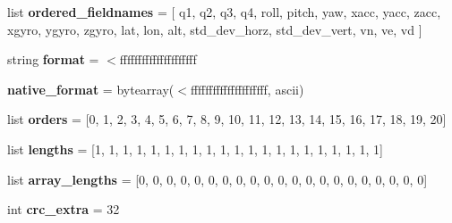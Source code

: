 \begin{DoxyCompactItemize}
list {\bfseries ordered\+\_\+fieldnames} = \mbox{[} \textquotesingle{}q1\textquotesingle{}, \textquotesingle{}q2\textquotesingle{}, \textquotesingle{}q3\textquotesingle{}, \textquotesingle{}q4\textquotesingle{}, \textquotesingle{}roll\textquotesingle{}, \textquotesingle{}pitch\textquotesingle{}, \textquotesingle{}yaw\textquotesingle{}, \textquotesingle{}xacc\textquotesingle{}, \textquotesingle{}yacc\textquotesingle{}, \textquotesingle{}zacc\textquotesingle{}, \textquotesingle{}xgyro\textquotesingle{}, \textquotesingle{}ygyro\textquotesingle{}, \textquotesingle{}zgyro\textquotesingle{}, \textquotesingle{}lat\textquotesingle{}, \textquotesingle{}lon\textquotesingle{}, \textquotesingle{}alt\textquotesingle{}, \textquotesingle{}std\+\_\+dev\+\_\+horz\textquotesingle{}, \textquotesingle{}std\+\_\+dev\+\_\+vert\textquotesingle{}, \textquotesingle{}vn\textquotesingle{}, \textquotesingle{}ve\textquotesingle{}, \textquotesingle{}vd\textquotesingle{} \mbox{]}
\item 
\mbox{\label{classpymavlink_1_1dialects_1_1v10_1_1MAVLink__sim__state__message_ae108efb7623dfd9832852e7d9519d39d}} 
string {\bfseries format} = \textquotesingle{}$<$fffffffffffffffffffff\textquotesingle{}
\item 
\mbox{\label{classpymavlink_1_1dialects_1_1v10_1_1MAVLink__sim__state__message_aaad3dd4fc93d4f531646af88d8e177db}} 
{\bfseries native\+\_\+format} = bytearray(\textquotesingle{}$<$fffffffffffffffffffff\textquotesingle{}, \textquotesingle{}ascii\textquotesingle{})
\item 
\mbox{\label{classpymavlink_1_1dialects_1_1v10_1_1MAVLink__sim__state__message_a41251cb233e0767b2ad0c4e8235ebb76}} 
list {\bfseries orders} = \mbox{[}0, 1, 2, 3, 4, 5, 6, 7, 8, 9, 10, 11, 12, 13, 14, 15, 16, 17, 18, 19, 20\mbox{]}
\item 
\mbox{\label{classpymavlink_1_1dialects_1_1v10_1_1MAVLink__sim__state__message_aaa634251d5ffc6507e310f79b3a14fb3}} 
list {\bfseries lengths} = \mbox{[}1, 1, 1, 1, 1, 1, 1, 1, 1, 1, 1, 1, 1, 1, 1, 1, 1, 1, 1, 1, 1\mbox{]}
\item 
\mbox{\label{classpymavlink_1_1dialects_1_1v10_1_1MAVLink__sim__state__message_ad247e7a6152ecfe91200f345243bcfa1}} 
list {\bfseries array\+\_\+lengths} = \mbox{[}0, 0, 0, 0, 0, 0, 0, 0, 0, 0, 0, 0, 0, 0, 0, 0, 0, 0, 0, 0, 0\mbox{]}
\item 
\mbox{\label{classpymavlink_1_1dialects_1_1v10_1_1MAVLink__sim__state__message_a759a63dd3af04ab8e622b429f0eeaa04}} 
int {\bfseries crc\+\_\+extra} = 32
\end{DoxyCompactItemize}


